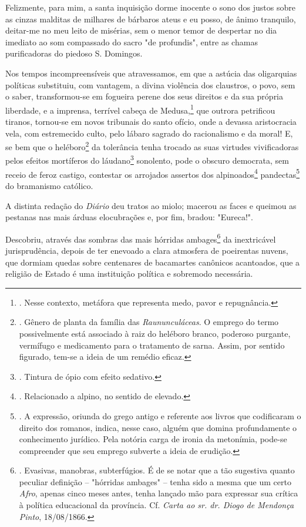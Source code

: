 Felizmente, para mim, a santa inquisição dorme inocente o sono dos
justos sobre as cinzas malditas de milhares de bárbaros ateus e eu
posso, de ânimo tranquilo, deitar-me no meu leito de misérias, sem o
menor temor de despertar no dia imediato ao som compassado do sacro "de
profundis", entre as chamas purificadoras do piedoso S. Domingos.

Nos tempos incompreensíveis que atravessamos, em que a astúcia das
oligarquias políticas substituiu, com vantagem, a divina violência dos
claustros, o povo, sem o saber, transformou-se em fogueira perene dos
seus direitos e da sua própria liberdade, e a imprensa, terrível cabeça
de Medusa,\footnote{. Nesse contexto, metáfora que representa medo,
  pavor e repugnância.} que outrora petrificou tiranos, tornou-se em
novos tribunais do santo ofício, onde a devassa aristocracia vela, com
estremecido culto, pelo lábaro sagrado do racionalismo e da moral! E, se
bem que o heléboro\footnote{. Gênero de planta da família das
  \emph{Raununculáceas}. O emprego do termo possivelmente está associado
  à raiz do heléboro branco, poderoso purgante, vermífugo e medicamento
  para o tratamento de sarna. Assim, por sentido figurado, tem-se a
  ideia de um remédio eficaz.} da tolerância tenha trocado as suas
virtudes vivificadoras pelos efeitos mortíferos do láudano\footnote{.
  Tintura de ópio com efeito sedativo.} sonolento, pode o obscuro
democrata, sem receio de feroz castigo, contestar os arrojados assertos
dos alpinoados\footnote{. Relacionado a alpino, no sentido de elevado.}
pandectas\footnote{. A expressão, oriunda do grego antigo e referente
  aos livros que codificaram o direito dos romanos, indica, nesse caso,
  alguém que domina profundamente o conhecimento jurídico. Pela notória
  carga de ironia da metonímia, pode-se compreender que seu emprego
  subverte a ideia de erudição.} do bramanismo católico.

A distinta redação do \emph{Diário} deu tratos ao miolo; macerou as
faces e queimou as pestanas nas mais árduas elocubrações e, por fim,
bradou: "Eureca!".

Descobriu, através das sombras das mais hórridas ambages\footnote{.
  Evasivas, manobras, subterfúgios. É de se notar que a tão sugestiva
  quanto peculiar definição -- "hórridas ambages" -- tenha sido a mesma
  que um certo \emph{Afro}, apenas cinco meses antes, tenha lançado mão
  para expressar sua crítica à política educacional da província. Cf.
  \emph{Carta ao sr. dr. Diogo de Mendonça Pinto}, 18/08/1866.} da
inextricável jurisprudência, depois de ter enevoado a clara atmosfera de
poeirentas nuvens, que dormiam quedas sobre centenares de bacamartes
canônicos acantoados, que a religião de Estado é uma instituição
política e sobremodo necessária.

